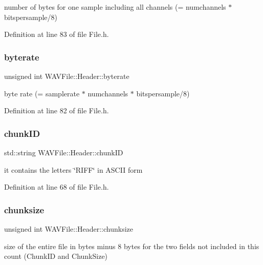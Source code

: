 number of bytes for one sample including all channels (= numchannels $\ast$ bitspersample/8) 

Definition at line 83 of file File.\+h.

\mbox{\label{struct_w_a_v_file_1_1_header_ac6e4c7534bfdd6e9cbd4b73079438e7f}} 
\subsubsection{\texorpdfstring{byterate}{byterate}}
{\footnotesize\ttfamily unsigned int W\+A\+V\+File\+::\+Header\+::byterate}

byte rate (= samplerate $\ast$ numchannels $\ast$ bitspersample/8) 

Definition at line 82 of file File.\+h.

\mbox{\label{struct_w_a_v_file_1_1_header_a796a84d05ba0ddeb837804dff90b730b}} 
\subsubsection{\texorpdfstring{chunk\+ID}{chunkID}}
{\footnotesize\ttfamily std\+::string W\+A\+V\+File\+::\+Header\+::chunk\+ID}

it contains the letters \char`\"{}\+R\+I\+F\+F\char`\"{} in A\+S\+C\+II form 

Definition at line 68 of file File.\+h.

\mbox{\label{struct_w_a_v_file_1_1_header_aee17e466b00a8b1d274be731f58d5fc0}} 
\subsubsection{\texorpdfstring{chunksize}{chunksize}}
{\footnotesize\ttfamily unsigned int W\+A\+V\+File\+::\+Header\+::chunksize}

size of the entire file in bytes minus 8 bytes for the two fields not included in this count (Chunk\+ID and Chunk\+Size) 

